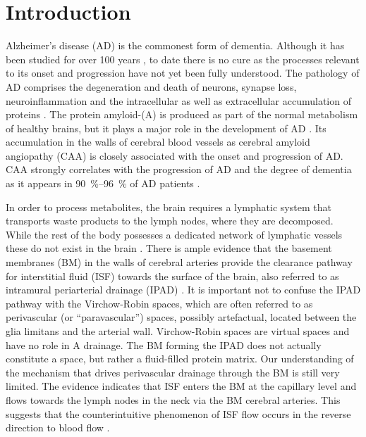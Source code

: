 \documentclass{frontiersFPHY} %
\newcommand{\Ab}{A\textbeta\xspace}
\begin{document}
\section{Introduction}

Alzheimer's disease (AD) is the commonest form of dementia. Although it has been studied for over 100 years \cite{Selkoe2001}, to date there is no cure as the processes relevant to its onset and progression have not yet been fully understood. The pathology of AD comprises the degeneration and death of neurons, synapse loss, neuroinflammation and the intracellular as well as extracellular accumulation of proteins \cite{Koffie2011}. The protein amyloid-\textbeta\xspace (\Ab) is produced as part of the normal metabolism of healthy brains, but it plays a major role in the development of AD \cite{Haass1992}. Its accumulation in the walls of cerebral blood vessels as cerebral amyloid angiopathy (CAA) is closely associated with the onset and progression of AD. CAA strongly correlates with the progression of AD and the degree of dementia as it appears in \SIrange{90}{96}{\percent} of AD patients \cite{Weller2006, Weller2009}.

In order to process metabolites, the brain requires a lymphatic system that transports waste products to the lymph nodes, where they are decomposed. While the rest of the body possesses a dedicated network of lymphatic vessels these do not exist in the brain \cite{Weller2010}. There is ample evidence that the basement membranes (BM) in the walls of cerebral arteries provide the clearance pathway for interstitial fluid (ISF) towards the surface of the brain, also referred to as intramural periarterial drainage (IPAD) \cite{Weller2010,Carare2008,Hawkes2011,Morris2014}. It is important not to confuse the IPAD pathway with the Virchow-Robin spaces, which are often referred to as perivascular (or ``paravascular'') spaces, possibly artefactual, located between the glia limitans and the arterial wall. Virchow-Robin spaces are virtual spaces and have no role in \Ab drainage. The BM forming the IPAD does not actually constitute a space, but rather a fluid-filled protein matrix. Our understanding of the mechanism that drives perivascular drainage through the BM is still very limited. The evidence indicates that ISF enters the BM at the capillary level and flows towards the lymph nodes in the neck via the BM cerebral arteries. This suggests that the counterintuitive phenomenon of ISF flow occurs in the reverse direction to blood flow \cite{Carare2008}.
\end{document}

